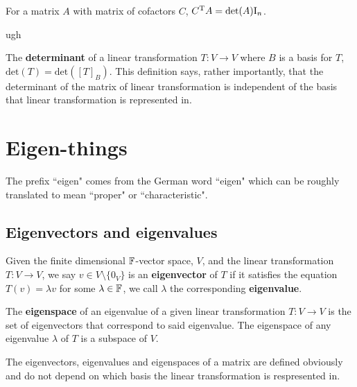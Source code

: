 \documentclass[../Year1/Year1.tex]{subfiles}
\begin{document}
\begin{theorem}
    For a matrix $A$ with matrix of cofactors $C$, $C^{\mathrm{T}} A = \text{det}(A)\mathrm{I}_n$.
\end{theorem}

\begin{theorem}
    ugh
\end{theorem}

\begin{definition}
    The \textbf{determinant} of a linear transformation $T:V\rightarrow V$ where $B$ is a basis for $T$, $\text{det}(T) = \text{det}([T]_B)$. This definition says, rather importantly, that the determinant of the matrix of linear transformation is independent of the basis that linear transformation is represented in.
\end{definition}

\section{Eigen-things}
The prefix ``eigen" comes from the German word ``eigen" which can be roughly translated to mean ``proper" or ``characteristic".

\subsection{Eigenvectors and eigenvalues}

\begin{definition}
    Given the finite dimensional $\mathbb{F}$-vector space, $V$, and the linear transformation $T:V\rightarrow V$, we say $v\in V\setminus{\{0_V\}}$ is an \textbf{eigenvector} of $T$ if it satisfies the equation $T(v)=\lambda v$ for some $\lambda \in \mathbb{F}$, we call $\lambda$ the corresponding \textbf{eigenvalue}.
\end{definition}

\begin{definition}[Eigenspace]
    The \textbf{eigenspace} of an eigenvalue of a given linear transformation $T:V\rightarrow V$ is the set of eigenvectors that correspond to said eigenvalue. The eigenspace of any eigenvalue $\lambda$  of $T$ is a subspace of $V$.
\end{definition}

\begin{remark}
    The eigenvectors, eigenvalues and eigenspaces of a matrix are defined obviously and do not depend on which basis the linear transformation is respresented in.
\end{remark}
\end{document}

